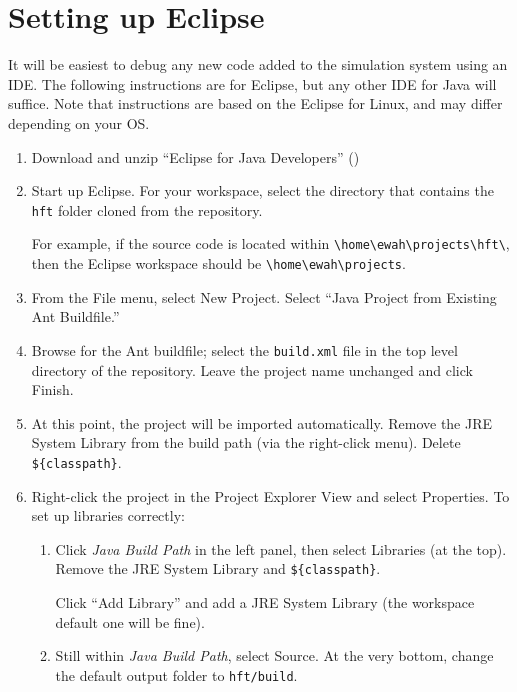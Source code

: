 \documentclass[11pt]{article}
\begin{document}
\section{Setting up Eclipse}

It will be easiest to debug any new code added to the simulation system using an IDE. The following instructions are for Eclipse, but any other IDE for Java will suffice. Note that instructions are based on the Eclipse for Linux, and may differ depending on your OS.

\begin{enumerate}
\item Download and unzip ``Eclipse for Java Developers'' ()

\item Start up Eclipse. For your workspace, select the directory that contains the \verb|hft| folder cloned from the repository.

For example, if the source code is located within \verb|\home\ewah\projects\hft\|, then the Eclipse workspace should be \verb|\home\ewah\projects|.

\item From the File menu, select New Project. Select ``Java Project from Existing Ant Buildfile.''

\item Browse for the Ant buildfile; select the \verb|build.xml| file in the top level directory of the repository. Leave the project name unchanged and click Finish.

\item At this point, the project will be imported automatically. Remove the JRE System Library from the build path (via the right-click menu). Delete \verb|${classpath}|.

\item Right-click the project in the Project Explorer View and select Properties. To set up libraries correctly:

\begin{enumerate}
\item Click \emph{Java Build Path} in the left panel, then select Libraries (at the top). Remove the JRE System Library and \verb|${classpath}|.

Click ``Add Library'' and add a JRE System Library (the workspace default one will be fine).

\item Still within \emph{Java Build Path}, select Source. At the very bottom, change the default output folder to \verb|hft/build|.


\end{enumerate}
\end{enumerate}
\end{document}
